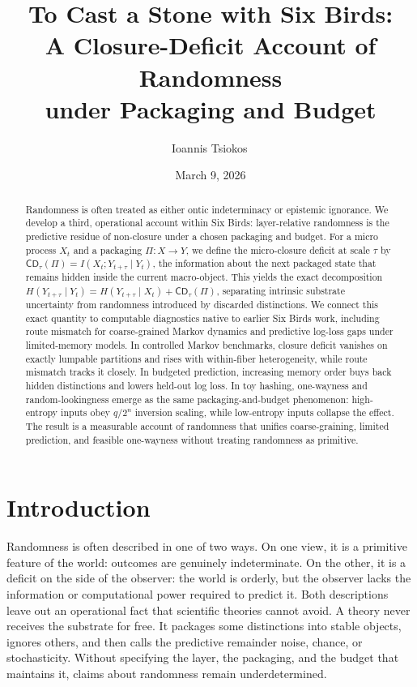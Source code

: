 \documentclass[11pt]{article}
\title{To Cast a Stone with Six Birds:\texorpdfstring{\\[4pt]}{ }A Closure-Deficit Account of Randomness\texorpdfstring{\\}{ }under Packaging and Budget}
\author{Ioannis Tsiokos\,\orcidlink{0009-0009-7659-5964}}
\date{March 9, 2026}
\numberwithin{equation}{section}
\begin{document}
\maketitle
\thispagestyle{firstpage}

\begin{abstract}
Randomness is often treated as either ontic indeterminacy or epistemic ignorance. We develop a third, operational account within Six Birds: layer-relative randomness is the predictive residue of non-closure under a chosen packaging and budget. For a micro process $X_t$ and a packaging $\Pi : X \to Y$, we define the micro-closure deficit at scale $\tau$ by $\mathsf{CD}_\tau(\Pi)=I(X_t; Y_{t+\tau} \mid Y_t)$, the information about the next packaged state that remains hidden inside the current macro-object. This yields the exact decomposition $H(Y_{t+\tau}\mid Y_t)=H(Y_{t+\tau}\mid X_t)+\mathsf{CD}_\tau(\Pi)$, separating intrinsic substrate uncertainty from randomness introduced by discarded distinctions. We connect this exact quantity to computable diagnostics native to earlier Six Birds work, including route mismatch for coarse-grained Markov dynamics and predictive log-loss gaps under limited-memory models. In controlled Markov benchmarks, closure deficit vanishes on exactly lumpable partitions and rises with within-fiber heterogeneity, while route mismatch tracks it closely. In budgeted prediction, increasing memory order buys back hidden distinctions and lowers held-out log loss. In toy hashing, one-wayness and random-lookingness emerge as the same packaging-and-budget phenomenon: high-entropy inputs obey $q/2^n$ inversion scaling, while low-entropy inputs collapse the effect. The result is a measurable account of randomness that unifies coarse-graining, limited prediction, and feasible one-wayness without treating randomness as primitive.
 \end{abstract}

\section{Introduction}\label{sec:intro}

Randomness is often described in one of two ways. On one view, it is a primitive feature of the world: outcomes are genuinely indeterminate. On the other, it is a deficit on the side of the observer: the world is orderly, but the observer lacks the information or computational power required to predict it. Both descriptions leave out an operational fact that scientific theories cannot avoid. A theory never receives the substrate for free. It packages some distinctions into stable objects, ignores others, and then calls the predictive remainder noise, chance, or stochasticity. Without specifying the layer, the packaging, and the budget that maintains it, claims about randomness remain underdetermined.
\end{document}
